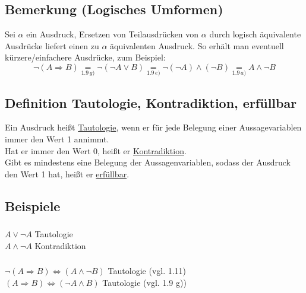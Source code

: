 \documentclass[10pt,a4paper,titlepage,fleqn]{article}
\begin{document}
\subsection{Bemerkung (Logisches Umformen)}
	Sei $\alpha$ ein Ausdruck, Ersetzen von Teilausdrücken von $\alpha$ durch logisch
 	äquivalente Ausdrücke liefert einen zu $\alpha$ äquivalenten Ausdruck. So erhält man
 	eventuell kürzere/einfachere Ausdrücke, zum Beispiel:
	\[\neg (A\Rightarrow B) \underset{1.9\,g)}{=}\neg(\neg A\vee B) \underset{1.9\, e)}{=}\neg(\neg A) \wedge (\neg B) \underset{1.9\, a)}{=}A\wedge \neg B\]
\subsection{Definition Tautologie, Kontradiktion, erfüllbar }
	Ein Ausdruck heißt \underline{Tautologie}, 
	wenn er für jede Belegung einer Aussagevariablen immer den
	Wert 1 annimmt.\\
	Hat er immer den Wert 0, heißt er \underline{Kontradiktion}.\\
	Gibt es mindestens eine Belegung der Aussagenvariablen, sodass der Ausdruck den Wert 1 hat, heißt
	er \underline{erfüllbar}.
\subsection{Beispiele}
\subsubsection{} $A\vee \neg A$ Tautologie\\
	\hphantom{a)  } $A\wedge \neg A$ Kontradiktion
\subsubsection{} $\neg (A \Rightarrow B) \Leftrightarrow (A\wedge \neg B)$ Tautologie (vgl. 1.11)\\
	\hphantom{b)  } $(A \Rightarrow B) \Leftrightarrow (\neg A\wedge B)$ Tautologie (vgl. 1.9 g))
\end{document}
